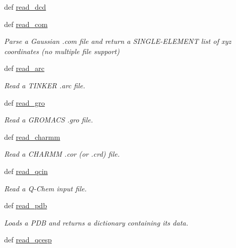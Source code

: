 \begin{DoxyCompactItemize}
\item 
def \hyperlink{classforcebalance_1_1molecule_1_1Molecule_ad8fa6cc7424aae00ee3f5bb87d28e037}{read\-\_\-dcd}
\item 
def \hyperlink{classforcebalance_1_1molecule_1_1Molecule_a861feda06e1f60ab25c45eaaaf228cfc}{read\-\_\-com}
\begin{DoxyCompactList}\small\item\em Parse a Gaussian .com file and return a S\-I\-N\-G\-L\-E-\/\-E\-L\-E\-M\-E\-N\-T list of xyz coordinates (no multiple file support) \end{DoxyCompactList}\item 
def \hyperlink{classforcebalance_1_1molecule_1_1Molecule_aeb5983ae61079198f077f55e448e2c32}{read\-\_\-arc}
\begin{DoxyCompactList}\small\item\em Read a T\-I\-N\-K\-E\-R .arc file. \end{DoxyCompactList}\item 
def \hyperlink{classforcebalance_1_1molecule_1_1Molecule_a963a4382dc59ebd8dd9ee2064843e355}{read\-\_\-gro}
\begin{DoxyCompactList}\small\item\em Read a G\-R\-O\-M\-A\-C\-S .gro file. \end{DoxyCompactList}\item 
def \hyperlink{classforcebalance_1_1molecule_1_1Molecule_a8b8d3444945cab760288f28996787855}{read\-\_\-charmm}
\begin{DoxyCompactList}\small\item\em Read a C\-H\-A\-R\-M\-M .cor (or .crd) file. \end{DoxyCompactList}\item 
def \hyperlink{classforcebalance_1_1molecule_1_1Molecule_a003b182b54de4473c4691ae1474b1ada}{read\-\_\-qcin}
\begin{DoxyCompactList}\small\item\em Read a Q-\/\-Chem input file. \end{DoxyCompactList}\item 
def \hyperlink{classforcebalance_1_1molecule_1_1Molecule_afadc87c0cc32dc73558cd901a4c64dd4}{read\-\_\-pdb}
\begin{DoxyCompactList}\small\item\em Loads a P\-D\-B and returns a dictionary containing its data. \end{DoxyCompactList}\item 
def \hyperlink{classforcebalance_1_1molecule_1_1Molecule_a27fb6201b435a3b205ae62f605256f3d}{read\-\_\-qcesp}

\end{DoxyCompactItemize}

